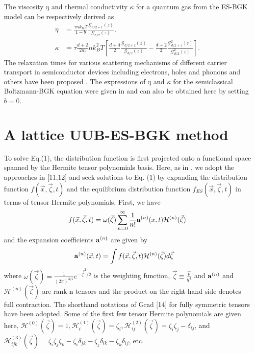 \documentclass[doublecol]{epl2}
\begin{document}
The viscosity $\eta$ and thermal conductivity $\kappa$ for a quantum gas from the ES-BGK model can be respectively derived as
\begin{align}
\eta &= \frac{\tau n  k_B T}{1-b} \frac{\mathcal{G}_{d/2+1}(z)}{\mathcal{G}_{d/2}(z) }, \\
\kappa &= \tau \frac{d+2}{2m} n k_B^2 T [\frac{d+4}{2} \frac{\mathcal{G}_{d/2+2}(z)}{\mathcal{G}_{d/2}(z) } -\frac{d+2}{2}\frac{\mathcal{G}^2_{d/2+1}(z)}{\mathcal{G}^2_{d/2}(z)}].
\end{align}
The relaxation times for various scattering mechanisms of different carrier transport in semiconductor devices including electrons, holes and phonons and others have been proposed \cite{Lund2000, Chen2005}.  The expressions of $\eta$ and $\kappa$ for the semiclassical Boltzmann-BGK equation were given in \cite{Shi2008} and can also be obtained here by setting $b=0$.

\section{A lattice UUB-ES-BGK method}

To solve Eq.(1), the distribution function is first projected onto a functional space spanned by the Hermite tensor polynomials basis.
Here, as in \cite{Yang2009}, we adopt the approaches in [11,12] and seek solutions to Eq. (1) by expanding the distribution function $f(\vec x,\vec \zeta, t)$ and the equilibrium distribution function $f_{ES}(\vec x, \vec\zeta, t)$ in terms of tensor Hermite polynomials.  First, we have
\begin{align}
 f(\vec x,\vec\zeta ,t) =\omega (\vec\zeta )\sum _{n=0}^{\infty}
\frac{1}{n!} {\bf a}^{(n)}(x,t) {{\mathcal H}}^{(n)} (\vec\zeta )
\end{align}
and the expansion coefficients ${\bf a}^{(n)}$ are given by
\begin{align}
{\bf a}^{(n)} (\vec x,t)&=\int f(\vec x,\vec\zeta ,t) {{\mathcal H}}^{(n)}(\vec\zeta) d\vec\zeta
\label{eq:expasion_coefs}
\end{align}
where $\omega (\vec\zeta) = \frac{1}{(2\pi)^{3/2} } e^{-\vec\zeta^2/2}$ is the weighting function, $\vec\zeta \equiv \frac{\vec p}{h^3}$ and ${\bf a}^{(n)}$ and ${{\mathcal H} }^{(n)} (\vec\zeta )$ are rank-n tensors and the product on the right-hand side denotes full contraction.   The shorthand notations of Grad [14] for fully symmetric tensors have been adopted.
Some of the first few tensor Hermite polynomials are given here, ${{\mathcal H}}^{(0)} (\vec\zeta ) = 1, {{\mathcal H}} _{i}^{(1)} (\vec\zeta )=\zeta _{i}, {{\mathcal H}}_{ij}^{(2)} (\vec\zeta ) =\zeta _{i} \zeta _{j} - \delta _{ij}$, and ${{\mathcal H}}_{ijk}^{(3)} (\vec\zeta ) =\zeta _{i} \zeta _{j} \zeta _{k}-\zeta _{i}\delta_{jk} -\zeta _{j}\delta _{ik} -\zeta _{k} \delta _{ij}$, etc.
\end{document}
